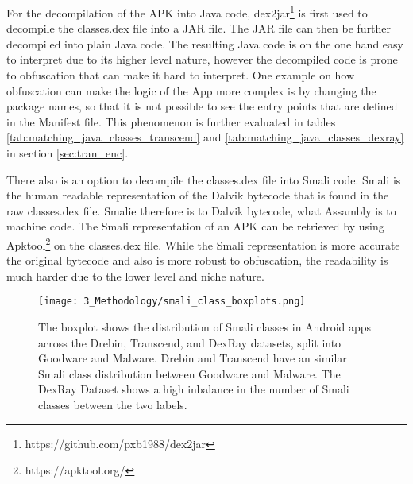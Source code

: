 For the decompilation of the APK into Java code, dex2jar\footnote{https://github.com/pxb1988/dex2jar} is first used to decompile the classes.dex file into a JAR file.
The JAR file can then be further decompiled into plain Java code. 
The resulting Java code is on the one hand easy to interpret due to its higher level nature, 
however the decompiled code is prone to obfuscation that can make it hard to interpret.
One example on how obfuscation can make the logic of the App more complex is by changing the package names, 
so that it is not possible to see the entry points that are defined in the Manifest file. 
This phenomenon is further evaluated in tables \ref{tab:matching_java_classes_transcend} and \ref{tab:matching_java_classes_dexray} in section
\ref{sec:tran_enc}.

There also is an option to decompile the classes.dex file into Smali code.
Smali is the human readable representation of the Dalvik bytecode that is found in the raw classes.dex file.
Smalie therefore is to Dalvik bytecode, what Assambly is to machine code.
The Smali representation of an APK can be retrieved by using Apktool\footnote{https://apktool.org/} on the classes.dex file.
While the Smali representation is more accurate the original bytecode and also is more robust to obfuscation, 
the readability is much harder due to the lower level and niche nature.

\begin{figure*}[b!]
    \centering
    \begin{minipage}{1.5\textwidth}
        \centering
        \texttt{[image: 3\_Methodology/smali\_class\_boxplots.png]}
        \captionsetup{width=\textwidth}
        \caption{\label{fig:smali_class_boxplots}
        The boxplot shows the distribution of Smali classes in Android apps 
        across the Drebin, Transcend, and DexRay datasets, 
        split into Goodware and Malware. 
        Drebin and Transcend have an similar Smali class distribution 
        between Goodware and Malware.
        The DexRay Dataset shows a high inbalance in the number of Smali classes 
        between the two labels.
        }
    \end{minipage}
\end{figure*}

